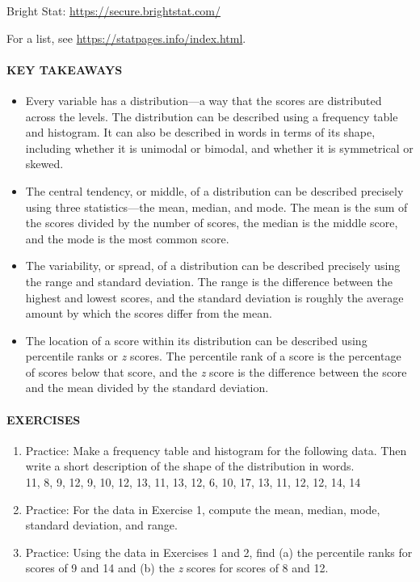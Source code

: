 \documentclass[
]{krantz}
\providecommand{\tightlist}{%
  \setlength{\itemsep}{0pt}\setlength{\parskip}{0pt}}
\begin{document}
Bright Stat: \url{https://secure.brightstat.com/}

For a list, see \url{https://statpages.info/index.html}.

\hypertarget{key-takeaways-34}{%
\paragraph*{KEY TAKEAWAYS}\label{key-takeaways-34}}

\begin{itemize}
\tightlist
\item
  Every variable has a distribution---a way that the scores are distributed across the levels. The distribution can be described using a frequency table and histogram. It can also be described in words in terms of its shape, including whether it is unimodal or bimodal, and whether it is symmetrical or skewed.
\item
  The central tendency, or middle, of a distribution can be described precisely using three statistics---the mean, median, and mode. The mean is the sum of the scores divided by the number of scores, the median is the middle score, and the mode is the most common score.
\item
  The variability, or spread, of a distribution can be described precisely using the range and standard deviation. The range is the difference between the highest and lowest scores, and the standard deviation is roughly the average amount by which the scores differ from the mean.
\item
  The location of a score within its distribution can be described using percentile ranks or \emph{z} scores. The percentile rank of a score is the percentage of scores below that score, and the \emph{z} score is the difference between the score and the mean divided by the standard deviation.
\end{itemize}

\hypertarget{exercises-28}{%
\paragraph*{EXERCISES}\label{exercises-28}}

\begin{enumerate}
\def\labelenumi{\arabic{enumi}.}
\tightlist
\item
  Practice: Make a frequency table and histogram for the following data. Then write a short description of the shape of the distribution in words.\\
  11, 8, 9, 12, 9, 10, 12, 13, 11, 13, 12, 6, 10, 17, 13, 11, 12, 12, 14, 14
\item
  Practice: For the data in Exercise 1, compute the mean, median, mode, standard deviation, and range.
\item
  Practice: Using the data in Exercises 1 and 2, find (a) the percentile ranks for scores of 9 and 14 and (b) the \emph{z} scores for scores of 8 and 12.
\end{enumerate}
\end{document}
